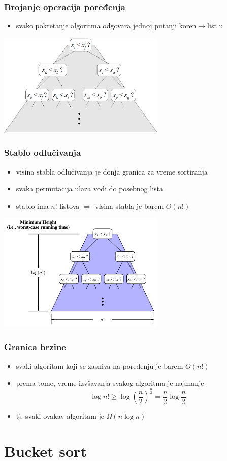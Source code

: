 \documentclass[compress]{beamer}
\begin{document}
\begin{frame}[fragile]
  \frametitle{Brojanje operacija poređenja}
  \begin{itemize}
    \item svako pokretanje algoritma odgovara jednoj putanji koren$\rightarrow$list u 
  \end{itemize}
  \begin{center}
    \includegraphics[width=8cm]{asp-12-pic29.png}
  \end{center}
\end{frame}

\begin{frame}[fragile]
  \frametitle{Stablo odlučivanja}
  \begin{itemize}
    \item visina stabla odlučivanja je donja granica za vreme sortiranja
    \item svaka permutacija ulaza vodi do posebnog lista
    \item stablo ima $n!$ listova $\Rightarrow$ visina stabla je barem $O(n!)$
  \end{itemize}
  \begin{center}
    \includegraphics[width=8cm]{asp-12-pic30.pdf}
  \end{center}
\end{frame}

\begin{frame}[fragile]
  \frametitle{Granica brzine}
  \begin{itemize}
    \item svaki algoritam koji se zasniva na poređenju je barem $O(n!)$
    \item prema tome, vreme izvšavanja svakog algoritma je najmanje
    $$\log n! \geq \log \left(\frac{n}{2}\right)^{\frac{n}{2}} = \frac{n}{2}\log\frac{n}{2}$$
    \item tj. svaki ovakav algoritam je $\Omega(n\log n)$
  \end{itemize}
\end{frame}

\section[Bucket sort]{Bucket sort}
\end{document}
